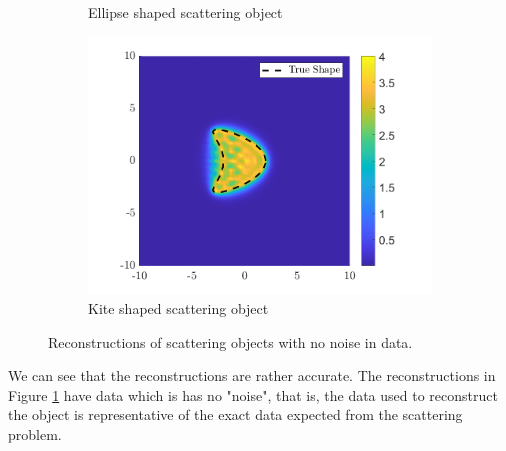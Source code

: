 \documentclass[]{article}
\begin{document}
\begin{figure}[h]
\begin{subfigure}{.3\textwidth}
					\caption{Ellipse shaped scattering object}
				\end{subfigure}
				\begin{subfigure}{.3\textwidth}
					\centering
					\includegraphics[width = \textwidth]{Numeric Simulations/Images/kite-Reconstructed}
					\caption{Kite shaped scattering object}
				\end{subfigure}
				\caption{Reconstructions of scattering objects with no noise in data.}
				\label{fig:noiseless}
			\end{figure} 
			We can see that the reconstructions are rather accurate. The reconstructions in Figure \ref{fig:noiseless} have data which is has no "noise", that is, the data used to reconstruct the object is representative of the exact data expected from the scattering problem.
			
\end{document}
